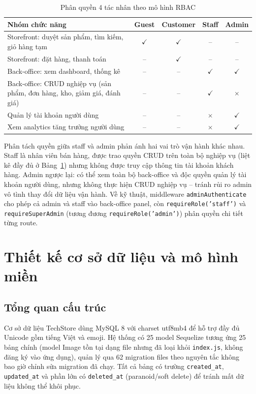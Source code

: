 \begin{table}[H]
  \centering
  \caption{Phân quyền 4 tác nhân theo mô hình RBAC}
  \label{tab:rbac}
  \begin{tabular}{|p{5.5cm}|c|c|c|c|}
    \hline
    \textbf{Nhóm chức năng} & \textbf{Guest} & \textbf{Customer} & \textbf{Staff} & \textbf{Admin} \\
    \hline
    Storefront: duyệt sản phẩm, tìm kiếm, giỏ hàng tạm & $\checkmark$ & $\checkmark$ & -- & -- \\
    \hline
    Storefront: đặt hàng, thanh toán & -- & $\checkmark$ & -- & -- \\
    \hline
    Back-office: xem dashboard, thống kê & -- & -- & $\checkmark$ & $\checkmark$ \\
    \hline
    Back-office: CRUD nghiệp vụ (sản phẩm, đơn hàng, kho, giảm giá, đánh giá) & -- & -- & $\checkmark$ & $\times$ \\
    \hline
    Quản lý tài khoản người dùng & -- & -- & $\times$ & $\checkmark$ \\
    \hline
    Xem analytics tăng trưởng người dùng & -- & -- & $\times$ & $\checkmark$ \\
    \hline
  \end{tabular}
\end{table}

Phân tách quyền giữa staff và admin phản ánh hai vai trò vận hành khác nhau. Staff là nhân viên bán hàng, được trao quyền CRUD trên toàn bộ nghiệp vụ (liệt kê đầy đủ ở Bảng~\ref{tab:rbac}) nhưng không được truy cập thông tin tài khoản khách hàng. Admin ngược lại: có thể xem toàn bộ back-office và độc quyền quản lý tài khoản người dùng, nhưng không thực hiện CRUD nghiệp vụ -- tránh rủi ro admin vô tình thay đổi dữ liệu vận hành. Về kỹ thuật, middleware \texttt{adminAuthenticate} cho phép cả admin và staff vào back-office panel, còn \texttt{requireRole('staff')} và \texttt{requireSuperAdmin} (tương đương \texttt{requireRole('admin')}) phân quyền chi tiết từng route.

\section{Thiết kế cơ sở dữ liệu và mô hình miền}
\label{sec:c3_database}

\subsection{Tổng quan cấu trúc}

Cơ sở dữ liệu TechStore dùng MySQL 8 với charset utf8mb4 để hỗ trợ đầy đủ Unicode gồm tiếng Việt và emoji. Hệ thống có 25 model Sequelize tương ứng 25 bảng chính (model Image tồn tại dạng file nhưng đã loại khỏi \texttt{index.js}, không đăng ký vào ứng dụng), quản lý qua 62 migration files theo nguyên tắc không bao giờ chỉnh sửa migration đã chạy. Tất cả bảng có trường \texttt{created\_at}, \texttt{updated\_at} và phần lớn có \texttt{deleted\_at} (paranoid/soft delete) để tránh mất dữ liệu không thể khôi phục.

